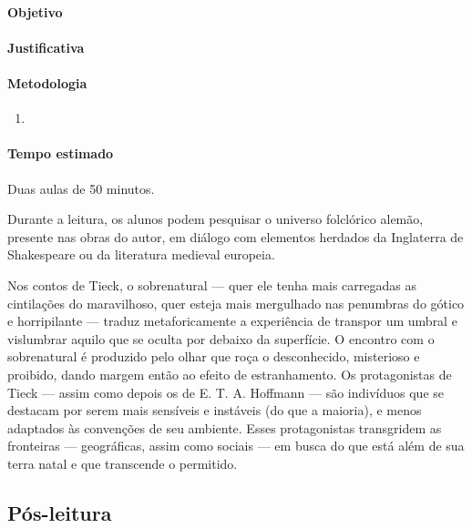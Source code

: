 \documentclass[11pt]{extarticle}
\begin{document}
\paragraph{Objetivo}

\paragraph{Justificativa}

\paragraph{Metodologia}
\begin{enumerate}

\item 

\end{enumerate}

\paragraph{Tempo estimado} Duas aulas de 50 minutos. 

Durante a leitura, os alunos podem pesquisar o universo
folclórico alemão, presente nas obras do autor, em diálogo com elementos
herdados da Inglaterra de Shakespeare ou da literatura medieval
europeia.

Nos contos de Tieck, o sobrenatural --- quer ele tenha mais carregadas
as cintilações do maravilhoso, quer esteja mais mergulhado nas penumbras
do gótico e horripilante --- traduz metaforicamente a experiência de
transpor um umbral e vislumbrar aquilo que se oculta por debaixo da
superfície. O encontro com o sobrenatural é produzido pelo olhar que
roça o desconhecido, misterioso e proibido, dando margem então ao efeito
de estranhamento. Os protagonistas de Tieck --- assim como depois os de
E. T. A. Hoffmann --- são indivíduos que se destacam por serem mais
sensíveis e instáveis (do que a maioria), e menos adaptados às
convenções de seu ambiente. Esses protagonistas transgridem as
fronteiras --- geográficas, assim como sociais --- em busca do que está
além de sua terra natal e que transcende o permitido.


\subsection{Pós-leitura}
\end{document}
